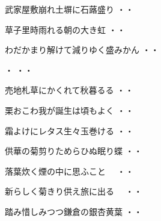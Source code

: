 \vspace{0.6cm}
\begin{shiika}武家屋敷崩れ土塀に石蕗盛り
\hfill{・・}\end{shiika}
\vspace{0.6cm}
\begin{shiika}草子里時雨れる朝の大き虹
\hfill{・・}\end{shiika}
\vspace{0.6cm}
\begin{shiika}わだかまり解けて減りゆく盛みかん
\hfill{・・}\end{shiika}
\vspace{0.6cm}
\begin{shiika}・
\hfill{・・}\end{shiika}
\vspace{0.6cm}
\begin{shiika}売地札草にかくれて秋暮るる
\hfill{・・}\end{shiika}
\vspace{0.6cm}
\begin{shiika}栗おこわ我が誕生は頃もよく
\hfill{・・}\end{shiika}
\vspace{0.6cm}
\begin{shiika}霜よけにレタス生々玉巻ける
\hfill{・・}\end{shiika}
\vspace{0.6cm}
\begin{shiika}供華の菊剪りためらひぬ眠り蝶
\hfill{・・}\end{shiika}
\vspace{0.6cm}
\begin{shiika}落葉炊く煙の中に思ふこと　
\hfill{・・}\end{shiika}
\vspace{0.6cm}
\begin{shiika}新らしく菊きり供え旅に出る　
\hfill{・・}\end{shiika}
\vspace{0.6cm}
\begin{shiika}踏み惜しみつつ鎌倉の銀杏黄葉
\hfill{・・}\end{shiika}
